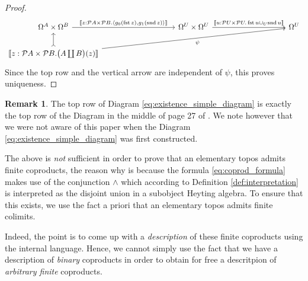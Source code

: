 \documentclass{birkjour}
\theoremstyle{plain}
\theoremstyle{definition}
\newtheorem{remark}[thm]{Remark}
\newcommand{\call}[1]{\mathcal{#1}}
\begin{document}
\begin{proof}
\begin{equation}
{				\begin{tikzcd}[column sep = huge]
					\Omega^A \times \Omega^B\arrow[rr, "{\llbracket z: \call{P}A \times \call{P}B.  \langle g_0(\operatorname{fst}z),g_1(\operatorname{snd}z)\rangle\rrbracket}"] & & \Omega^U \times \Omega^U\arrow[rr,"{\llbracket u: \call{P}U \times \call{P}U . \operatorname{fst}u \cup_U \operatorname{snd}u \rrbracket}"] & & \Omega^U\\
					\llbracket z: \call{P}A \times \call{P}B. \big(A \coprod B\big)(z) \rrbracket\arrow[u,rightarrowtail]\arrow[rrrru,swap,"{\psi}"]
			\end{tikzcd}}
		\end{equation}
		Since the top row and the vertical arrow are independent of $\psi$, this proves uniqueness.
	\end{proof}
	\begin{remark}
		The top row of Diagram \eqref{eq:existence_simple_diagram} is exactly the top row of the Diagram in the middle of page 27 of \cite{Mikkelson}. We note however that we were not aware of this paper when the Diagram \eqref{eq:existence_simple_diagram} was first constructed.
	\end{remark}
	The above is \emph{not} sufficient in order to prove that an elementary topos admits finite coproducts, the reason why is because the formula \eqref{eq:coprod_formula} makes use of the conjunction $\wedge$ which according to Definition \ref{def:interpretation} is interpreted as the disjoint union in a subobject Heyting algebra. To ensure that this exists, we use the fact a priori that an elementary topos admits finite colimits.
	
	Indeed, the point is to come up with a \emph{description} of these finite coproducts using the internal language. Hence, we cannot simply use the fact that we have a description of \emph{binary} coproducts in order to obtain for free a descritpion of \emph{arbitrary finite} coproducts.
	
\end{document}
